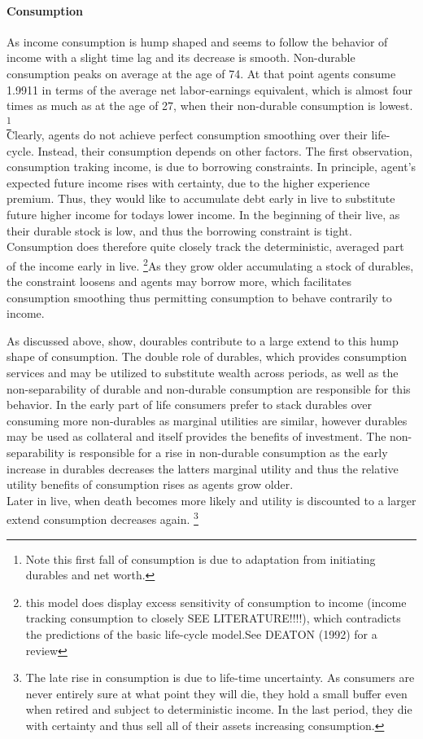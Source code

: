 \documentclass[a4paper,12pt,legno]{article}
\begin{document}
\paragraph{Consumption} As income consumption is hump shaped and seems to follow the behavior of income with a slight time lag and its decrease is smooth. Non-durable consumption peaks on average at the age of 74. At that point agents consume 1.9911 in terms of the average net labor-earnings equivalent, which is almost four times as much as at the age of 27, when their non-durable consumption is lowest. \footnote{Note this first fall of consumption is due to adaptation from initiating durables and net worth.} \\
Clearly, agents do not achieve perfect consumption smoothing over their life-cycle. Instead, their consumption depends on other factors. The first observation, consumption traking income, is due to borrowing constraints. In principle, agent's expected future income rises with certainty, due to the higher experience premium. Thus, they would like to accumulate debt early in live to substitute future higher income for todays lower income. In the beginning of their live, as their durable stock is low, and thus the borrowing constraint is tight. Consumption does therefore quite closely track the deterministic, averaged part of the income early in live. \footnote{this model does display excess sensitivity of consumption to income (income tracking consumption to closely SEE LITERATURE!!!!), which contradicts the predictions of the 
basic life-cycle model.See DEATON (1992) for a review}As they grow older accumulating a stock of durables, the constraint loosens and agents may borrow more, which facilitates consumption smoothing thus permitting consumption to behave contrarily to income. 

As discussed above, \citep{FV&K2011} show, dourables contribute to a large extend to this hump shape of consumption. The double role of durables, which provides consumption services and may be utilized to substitute wealth across periods, as well as the non-separability of durable and non-durable consumption are responsible for this behavior. In the early part of life consumers prefer to stack durables over consuming more non-durables as marginal utilities are similar, however durables may be used as collateral and itself provides the benefits of investment. The non-separability is responsible for a rise in non-durable consumption as the early increase in durables decreases the latters marginal utility and thus the relative utility benefits of consumption rises as agents grow older. \\ Later in live, when death becomes more likely and utility is discounted to a larger extend consumption decreases again. \footnote{The late rise in consumption is due to life-time uncertainty. As consumers are never entirely sure at what point they will die, they hold a small buffer even when retired and subject to deterministic income. In the last period, they die with certainty and thus sell all of their assets increasing consumption.} 
\end{document}
